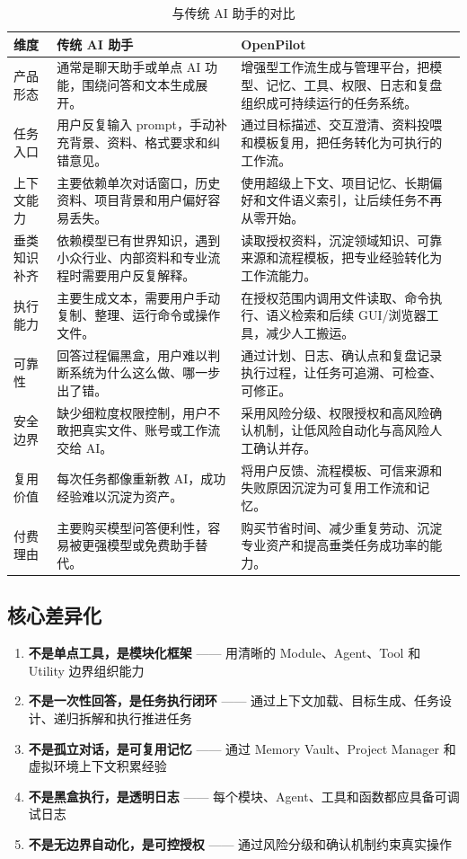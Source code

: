 \documentclass[12pt,a4paper]{ctexart}
\begin{document}
\begin{table}[htbp]
  \centering
  \small
  \begin{tabularx}{\textwidth}{p{2.8cm} X X}
    \toprule
    \textbf{维度} & \textbf{传统 AI 助手} & \textbf{OpenPilot} \\
    \midrule
    产品形态 & 通常是聊天助手或单点 AI 功能，围绕问答和文本生成展开。 & 增强型工作流生成与管理平台，把模型、记忆、工具、权限、日志和复盘组织成可持续运行的任务系统。 \\
    任务入口 & 用户反复输入 prompt，手动补充背景、资料、格式要求和纠错意见。 & 通过目标描述、交互澄清、资料投喂和模板复用，把任务转化为可执行的工作流。 \\
    上下文能力 & 主要依赖单次对话窗口，历史资料、项目背景和用户偏好容易丢失。 & 使用超级上下文、项目记忆、长期偏好和文件语义索引，让后续任务不再从零开始。 \\
    垂类知识补齐 & 依赖模型已有世界知识，遇到小众行业、内部资料和专业流程时需要用户反复解释。 & 读取授权资料，沉淀领域知识、可靠来源和流程模板，把专业经验转化为工作流能力。 \\
    执行能力 & 主要生成文本，需要用户手动复制、整理、运行命令或操作文件。 & 在授权范围内调用文件读取、命令执行、语义检索和后续 GUI/浏览器工具，减少人工搬运。 \\
    可靠性 & 回答过程偏黑盒，用户难以判断系统为什么这么做、哪一步出了错。 & 通过计划、日志、确认点和复盘记录执行过程，让任务可追溯、可检查、可修正。 \\
    安全边界 & 缺少细粒度权限控制，用户不敢把真实文件、账号或工作流交给 AI。 & 采用风险分级、权限授权和高风险确认机制，让低风险自动化与高风险人工确认并存。 \\
    复用价值 & 每次任务都像重新教 AI，成功经验难以沉淀为资产。 & 将用户反馈、流程模板、可信来源和失败原因沉淀为可复用工作流和记忆。 \\
    付费理由 & 主要购买模型问答便利性，容易被更强模型或免费助手替代。 & 购买节省时间、减少重复劳动、沉淀专业资产和提高垂类任务成功率的能力。 \\
    \bottomrule
  \end{tabularx}
  \caption{与传统 AI 助手的对比}
  \label{tab:comparison}
\end{table}

\subsection{核心差异化}

\begin{enumerate}
  \item \textbf{不是单点工具，是模块化框架} —— 用清晰的 Module、Agent、Tool 和 Utility 边界组织能力
  \item \textbf{不是一次性回答，是任务执行闭环} —— 通过上下文加载、目标生成、任务设计、递归拆解和执行推进任务
  \item \textbf{不是孤立对话，是可复用记忆} —— 通过 Memory Vault、Project Manager 和虚拟环境上下文积累经验
  \item \textbf{不是黑盒执行，是透明日志} —— 每个模块、Agent、工具和函数都应具备可调试日志
  \item \textbf{不是无边界自动化，是可控授权} —— 通过风险分级和确认机制约束真实操作
\end{enumerate}
\end{document}
